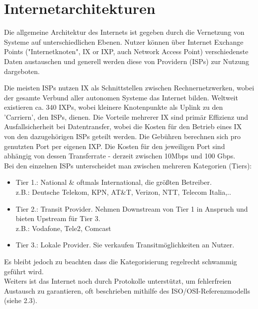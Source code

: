 \documentclass[11pt]{article}
\begin{document}
    \section{Internetarchitekturen}
    Die allgemeine Architektur des Internets ist gegeben durch die Vernetzung von
    Systeme auf unterschiedlichen Ebenen.  Nutzer können über Internet Exchange Points
    ("Internetknoten", IX or IXP, auch Network Access Point) verschiedenste Daten
    austauschen und generell werden diese von Providern (ISPs) zur Nutzung dargeboten.

    Die meisten ISPs nutzen IX als Schnittstellen zwischen Rechnernetzwerken, wobei der
    gesamte Verbund aller autonomen Systeme das Internet bilden. Weltweit existieren ca.
    340 IXPs, wobei kleinere Knotenpunkte als Uplink zu den 'Carriern', den ISPs, dienen.
    Die Vorteile mehrerer IX sind primär Effizienz und Ausfallsicherheit bei Datentransfer, wobei
    die Kosten für den Betrieb eines IX von den dazugehörigen ISPs geteilt werden. Die Gebühren
    berechnen sich pro genutzten Port per eigenen IXP. Die Kosten für den jeweiligen Port sind
    abhängig von dessen Transferrate - derzeit zwischen 10Mbps und 100 Gbps.\\

    \noindent Bei den einzelnen ISPs unterscheidet man zwischen mehreren Kategorien (Tiers):
    \begin{itemize}
    \item Tier 1.: National \& oftmals International, die größten Betreiber. \\
    z.B.: Deutsche Telekom, KPN, AT\&T, Verizon, NTT, Telecom Italia,..
    \item Tier 2.: Transit Provider. Nehmen Downstream von Tier 1 in Anspruch und bieten Upstream für Tier 3.\\
    z.B.: Vodafone, Tele2, Comcast
    \item Tier 3.: Lokale Provider. Sie verkaufen Transitmöglichkeiten an Nutzer.
    \end{itemize}
    \noindent Es bleibt jedoch zu beachten dass die Kategorisierung regelrecht schwammig geführt wird.\\

    \noindent Weiters ist das Internet noch durch Protokolle unterstützt, um fehlerfreien Austausch
    zu garantieren, oft beschrieben mithilfe des ISO/OSI-Referenzmodells (siehe 2.3).\\
\end{document}

